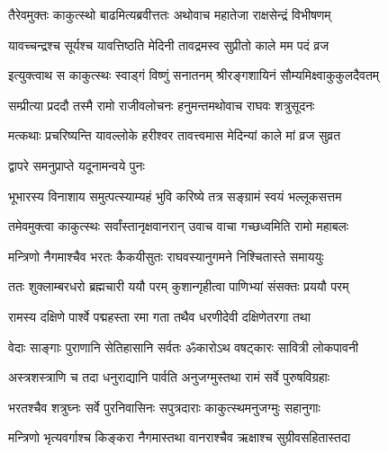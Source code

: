 \twolineshloka
{तैरेवमुक्तः काकुत्स्थो बाढमित्यब्रवीत्ततः}
{अथोवाच महातेजा राक्षसेन्द्रं विभीषणम्}%



\twolineshloka
{यावच्चन्द्रश्च सूर्यश्च यावत्तिष्ठति मेदिनी}
{तावद्रमस्व सुप्रीतो काले मम पदं व्रज}%


\twolineshloka
{इत्युक्त्वाथ स काकुत्स्थः स्वाड्गं विष्णुं सनातनम्}
{श्रीरङ्गशायिनं सौम्यमिक्ष्वाकुकुलदैवतम्}%

\twolineshloka
{सम्प्रीत्या प्रददौ तस्मै रामो राजीवलोचनः}
{हनुमन्तमथोवाच राघवः शत्रुसूदनः}%


\twolineshloka
{मत्कथाः प्रचरिष्यन्ति यावल्लोके हरीश्वर}
{तावत्त्वमास मेदिन्यां काले मां व्रज सुव्रत}%



\onelineshloka
{द्वापरे समनुप्राप्ते यदूनामन्वये पुनः}%

\twolineshloka
{भूभारस्य विनाशाय समुत्पत्स्याम्यहं भुवि}
{करिष्ये तत्र सङ्ग्रामं स्वयं भल्लूकसत्तम}%


\twolineshloka
{तमेवमुक्त्वा काकुत्स्थः सर्वांस्तानृक्षवानरान्}
{उवाच वाचा गच्छध्वमिति रामो महाबलः}%

\twolineshloka
{मन्त्रिणो नैगमाश्चैव भरतः कैकयीसुतः}
{राघवस्यानुगमने निश्चितास्ते समाययुः}%

\twolineshloka
{ततः शुक्लाम्बरधरो ब्रह्मचारी ययौ परम्}
{कुशान्गृहीत्वा पाणिभ्यां संसक्तः प्रययौ परम्}%

\twolineshloka
{रामस्य दक्षिणे पार्श्वे पद्महस्ता रमा गता}
{तथैव धरणीदेवी दक्षिणेतरगा तथा}%

\twolineshloka
{वेदाः साङ्गाः पुराणानि सेतिहासानि सर्वतः}
{ॐकारोऽथ वषट्कारः सावित्री लोकपावनी}%

\twolineshloka
{अस्त्रशस्त्राणि च तदा धनुराद्यानि पार्वति}
{अनुजग्मुस्तथा रामं सर्वे पुरुषविग्रहाः}%

\twolineshloka
{भरतश्चैव शत्रुघ्नः सर्वे पुरनिवासिनः}
{सपुत्रदाराः काकुत्स्थमनुजग्मुः सहानुगाः}%

\twolineshloka
{मन्त्रिणो भृत्यवर्गाश्च किङ्करा नैगमास्तथा}
{वानराश्चैव ऋक्षाश्च सुग्रीवसहितास्तदा}%

